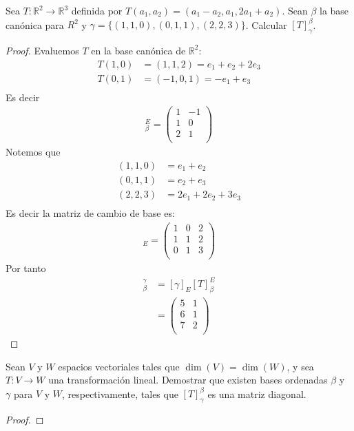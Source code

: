 \documentclass[11pt]{article}
\numberwithin{equation}{section}
\newcommand{\R}{\mathbb{R}}
\begin{document}
\begin{Problema}{} Sea $T: \R^2 \to \R^3$ definida por $T(a_1, a_2) = (a_1 - a_2, a_1, 2a_1 + a_2)$. 
    Sean $\beta$ la base canónica para $R^2$ y $\gamma = \{(1,1,0), (0,1,1), (2,2,3)\}$. 
    Calcular $[T]_{\gamma}^\beta$.
\end{Problema}
\begin{proof}
    Evaluemos $T$ en la base canónica de $\R^2$:
    \begin{align*}
        T(1,0)&=(1,1,2)=e_1+e_2+2e_3\\
        T(0,1)&=(-1,0,1)=-e_1+e_3\\
    \end{align*}
Es decir
\begin{align*}
    [T]_\beta^E=\begin{pmatrix}
        1 & -1 \\
        1 & 0 \\
        2 & 1 \\
    \end{pmatrix}
\end{align*}
Notemos que
\begin{align*}
    (1,1,0)&=e_1+e_2\\
    (0,1,1)&=e_2+e_3\\
    (2,2,3)&=2e_1+2e_2+3e_3\\
\end{align*}
Es decir la matriz de cambio de base es:
\begin{align*}
    [\gamma]_{E}=\begin{pmatrix}
        1 & 0 & 2 \\
        1 & 1 & 2 \\
        0 & 1 & 3 \\
    \end{pmatrix}
\end{align*}
Por tanto 
\begin{align*}
    [T]_\beta^\gamma&=[\gamma]_{E}[T]_\beta^E\\
    &=\begin{pmatrix}
        5 & 1 \\
        6 & 1 \\
        7 & 2 \\
    \end{pmatrix}
\end{align*}
\end{proof}


\begin{Problema}{} Sean $V$ y $W$ espacios vectoriales tales que $\dim(V) = \dim(W)$, y sea $T: V \to W$ una transformación lineal. 
    Demostrar que existen bases ordenadas $\beta$ y $\gamma$ para $V$ y $W$, respectivamente, tales que $[T]_{\gamma }^{\beta}$ es una matriz diagonal.
\end{Problema}      
\begin{proof}
    
\end{proof}
\end{document}
